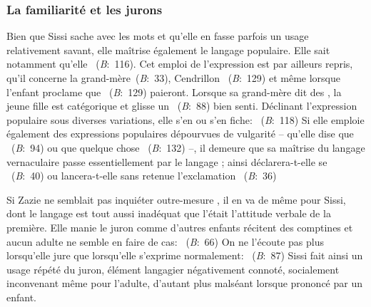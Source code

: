 \subsubsection{La familiarité et les jurons}
Bien que Sissi sache  avec les mots et qu'elle en fasse parfois un usage relativement savant, elle maîtrise également le langage populaire.
Elle sait notamment qu'elle ~(\textit{B}:~116).
Cet emploi de l'expression  est par ailleurs repris, qu'il concerne la grand-mère~(\textit{B}:~33), Cendrillon ~(\textit{B}:~129) et même lorsque l'enfant proclame que ~(\textit{B}:~129) paieront.
Lorsque sa grand-mère dit des , la jeune fille est catégorique et glisse un ~(\textit{B}:~88) bien senti.
Déclinant l'expression populaire sous diverses variations, elle s'en  ou s'en fiche: ~(\textit{B}:~118)
Si elle emploie également des expressions populaires dépourvues de vulgarité -- qu'elle dise que ~(\textit{B}:~94) ou que quelque chose ~(\textit{B}:~132) --, il demeure que sa maîtrise du langage vernaculaire passe essentiellement par le langage ; ainsi déclarera-t-elle se ~(\textit{B}:~40) ou lancera-t-elle sans retenue l'exclamation ~(\textit{B}:~36)
\par
Si Zazie ne semblait pas inquiéter outre-mesure , il en va de même pour Sissi, dont le langage est tout aussi inadéquat que l'était l'attitude verbale de la première.
Elle manie le juron comme d'autres enfants récitent des comptines et aucun adulte ne semble en faire de cas: ~(\textit{B}:~66)
On ne l'écoute pas plus lorsqu'elle jure que lorsqu'elle s'exprime normalement: ~(\textit{B}:~87)
Sissi fait ainsi un usage répété du juron, élément langagier négativement connoté, socialement inconvenant même pour l'adulte, d'autant plus malséant lorsque prononcé par un enfant.
